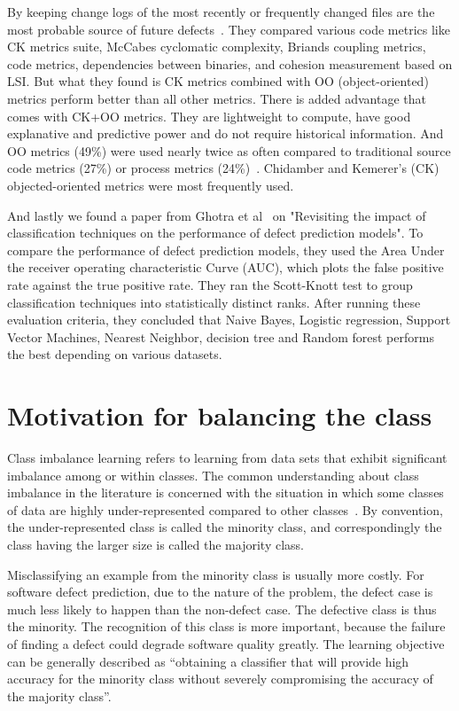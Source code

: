 \documentclass[conference]{IEEEtran}
\begin{document}
By keeping change logs of the most recently or frequently changed files are the most probable source of future defects~\cite{d2010extensive, hall2012systematic, catal2009systematic}. They compared various code metrics like CK  metrics  suite,  McCabes  cyclomatic  complexity, Briands coupling metrics, code metrics, dependencies between  binaries, and cohesion  measurement based  on LSI. But what they found is CK metrics combined with OO (object-oriented) metrics perform better than all other metrics.  There is added advantage that comes with CK+OO metrics. They are  lightweight  to  compute,  have good  explanative  and  predictive  power  and  do  not require historical information. And OO metrics (49\%) were used nearly twice as often compared to traditional source code metrics (27\%) or process metrics (24\%)~\cite{radjenovic2013software}. Chidamber and Kemerer's (CK) objected-oriented metrics were most frequently used.

And lastly we found a paper from Ghotra et al~\cite{ghotra2015revisiting} on "Revisiting the impact of classification techniques on the performance of defect prediction models". To  compare  the  performance  of  defect prediction  models,  they  used  the  Area  Under  the receiver operating characteristic Curve (AUC), which plots  the  false  positive  rate  against  the  true  positive rate. They ran the Scott-Knott test to group classification techniques into statistically distinct ranks. After running these evaluation criteria, they concluded that Naive Bayes, Logistic regression, Support Vector Machines, Nearest Neighbor, decision tree and Random forest performs the best depending on various datasets.

\section{Motivation for balancing the class}
\label{motivation}

Class imbalance learning refers to learning from data sets that exhibit significant imbalance among or within classes. The common understanding about class imbalance in the literature is concerned with the situation in which some classes of data are
highly under-represented compared to other classes~\cite{he2009learning}. By convention,
the under-represented class is called the minority class,
and correspondingly the class having the larger size is called the
majority class.

Misclassifying an example from the minority class is usually more costly. For software defect prediction, due to the nature of the problem, the defect case is much less likely to happen than the non-defect case.
The defective class is thus the minority. The recognition of this class is more important, because the failure of finding a defect could degrade software quality greatly. The learning objective can be generally described
as ``obtaining a classifier that will provide high accuracy for the minority class without severely compromising the accuracy of the majority class''.
\end{document}
